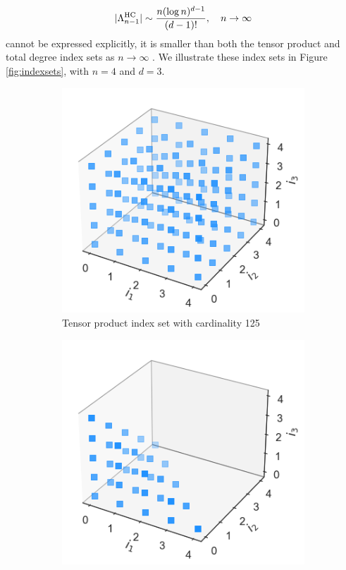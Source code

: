 \documentclass[12pt, oneside]{report}   	%
\DeclarePairedDelimiter{\abs}{\lvert}{\rvert}
\begin{document}
$$
\abs{\Lambda_{n-1}^{\mathrm{HC}}} \sim \frac{n(\log n)^{d-1}}{(d-1) !}, \quad n \rightarrow \infty
$$
cannot be expressed explicitly, it is smaller than both the tensor product and total degree index sets as $n\rightarrow\infty$ \cite{sparsepoly}. We illustrate these index sets in Figure \ref{fig:indexsets}, with $n=4$ and $d=3$.
\begin{figure}[t]
	\centering
	\begin{subfigure}[t]{.3\textwidth}
  		\centering
		\includegraphics[width=0.9\linewidth]{equad_multi1}
  		\caption{Tensor product index set with cardinality 125}
  		\label{fig:test1}
	\end{subfigure}%
	\begin{subfigure}[t]{.3\textwidth}
  		\centering
		\includegraphics[width=0.9\linewidth]{equad_multi2}

\end{subfigure}
\end{figure}
\end{document}
